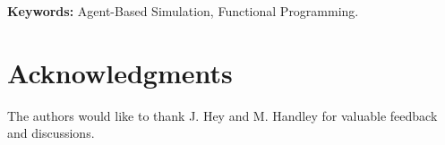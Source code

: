 \documentclass{scspaperproc}
\begin{document}
\textbf{Keywords:} Agent-Based Simulation, Functional Programming.

\maketitle













\section*{Acknowledgments}
The authors would like to thank J. Hey and M. Handley for valuable feedback and discussions.




\end{document}
